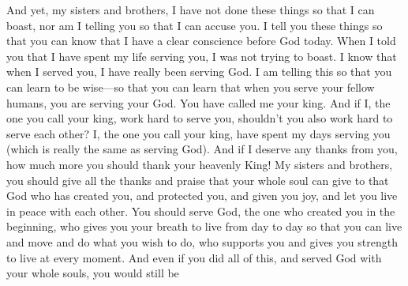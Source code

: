 And yet, my sisters and brothers, I have not done these things so that I can boast, nor am I telling you so that I can accuse you. I tell you these things so that you can know that I have a clear conscience before God today.
\bverse \iffalse Behold, I say unto you that because I said unto you that I had spent my days in your service, I do not desire to boast, for I have only been in the service of God. \fi
When I told you that I have spent my life serving you, I was not trying to boast. I know that when I served you, I have really been serving God.
\bverse \iffalse And behold, I tell you these things that ye may learn wisdom; that ye may learn that when ye are in the service of your fellow beings ye are only in the service of your God. \fi
I am telling this so that you can learn to be wise---so that you can learn that when you serve your fellow humans, you are serving your God.
\bverse \iffalse Behold, ye have called me your king; and if I, whom ye call your king, do labor to serve you, then ought not ye to labor to serve one another? \fi
You have called me your king. And if I, the one you call your king, work hard to serve you, shouldn't you also work hard to serve each other?
\bverse \iffalse And behold also, if I, whom ye call your king, who has spent his days in your service, and yet has been in the service of God, do merit any thanks from you, O how you ought to thank your heavenly King! \fi
I, the one you call your king, have spent my days serving you (which is really the same as serving God). And if I deserve any thanks from you, how much more you should thank your heavenly King!
\bverse \iffalse I say unto you, my brethren, that if you should render all the thanks and praise which your whole soul has power to possess, to that God who has created you, and has kept and preserved you, and has caused that ye should rejoice, and has granted that ye should live in peace one with another-- \fi
My sisters and brothers, you should give all the thanks and praise that your whole soul can give to that God who has created you, and protected you, and given you joy, and let you live in peace with each other.
\bverse \iffalse I say unto you that if ye should serve him who has created you from the beginning, and is preserving you from day to day, by lending you breath, that ye may live and move and do according to your own will, and even supporting you from one moment to another--I say, if ye should serve him with all your whole souls yet ye would be unprofitable servants. \fi
You should serve God, the one who created you in the beginning, who gives you your breath to live from day to day so that you can live and move and do what you wish to do, who supports you and gives you strength to live at every moment. And even if you did all of this, and served God with your whole souls, you would still be
